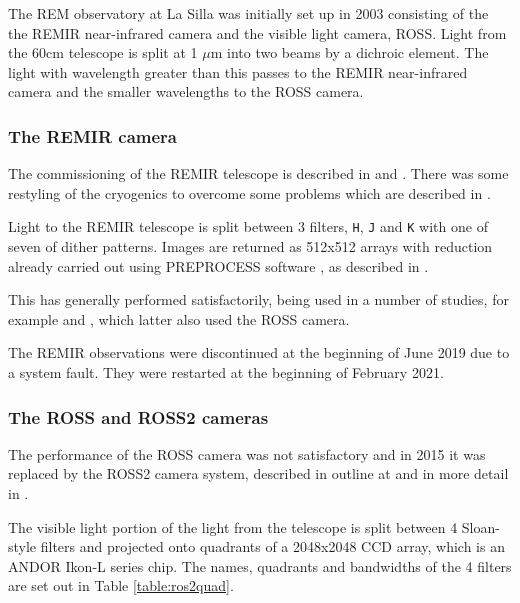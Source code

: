 The REM observatory at La Silla was initially set up in 2003
\citep{antonelli05} consisting of the the REMIR near-infrared camera and the
visible light camera, ROSS. Light from the 60cm telescope is split at 1 $\mu$m into two beams
by a dichroic element. The light with wavelength greater than this passes to the
REMIR near-infrared camera and the smaller wavelengths to the ROSS camera.

\subsubsection{The REMIR camera}

The commissioning of the REMIR telescope is described in \citet{conconi04} and
\citet{vitali03}. There was some restyling of the cryogenics to overcome some
problems which are described in \citet{vitali06}.

Light to the REMIR telescope is split between 3 filters, \texttt{H}, \texttt{J}
and \texttt{K} with one of seven of dither patterns. Images are returned as
512x512 arrays with reduction already carried out using PREPROCESS software
\citep{dipaola01}, as described in \citet{calzoletti05}.

This has generally performed satisfactorily, being used in a number of studies,
for example \citet{dammando11} and  \citet{davanzo06}, which latter also used the ROSS camera.

The REMIR observations were discontinued at the beginning of June 2019 due to a
system fault. They were restarted at the beginning of February 2021.

\subsubsection{The ROSS and ROSS2 cameras}

The performance of the ROSS camera was not satisfactory and in 2015 it
was replaced by the ROSS2 camera system, described in outline at
\citet{reminaf7} and in more detail in \citet{molinari14}.

The visible light portion of the light from the telescope is split between 4
Sloan-style filters and projected onto quadrants of a 2048x2048 CCD array, which
is an ANDOR Ikon-L series chip. The names, quadrants and bandwidths of the 4
filters are set out in Table \ref{table:ros2quad}.


